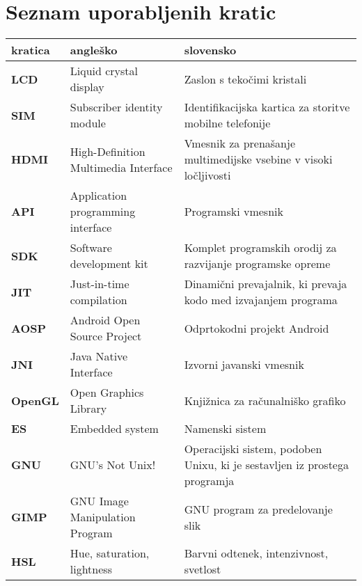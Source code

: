 \chapter*{Seznam uporabljenih kratic}

\begin{tabular}{l|p{5cm}|p{6cm}}
  {\bf kratica} & {\bf angleško} & {\bf slovensko} \\ \hline
  {\bf LCD} & Liquid crystal display & Zaslon s tekočimi kristali \\
  {\bf SIM} & Subscriber identity module & Identifikacijska kartica za storitve mobilne telefonije \\
  {\bf HDMI} & High-Definition Multimedia Interface & Vmesnik za prenašanje multimedijske vsebine v visoki ločljivosti \\
  {\bf API} & Application programming interface & Programski vmesnik \\
  {\bf SDK} & Software development kit & Komplet programskih orodij za razvijanje programske opreme \\
  {\bf JIT} & Just-in-time compilation & Dinamični prevajalnik, ki prevaja kodo med izvajanjem programa \\
  {\bf AOSP} & Android Open Source Project & Odprtokodni projekt Android \\
  {\bf JNI} & Java Native Interface & Izvorni javanski vmesnik \\
  {\bf OpenGL} & Open Graphics Library & Knjižnica za računalniško grafiko \\
  {\bf ES} & Embedded system & Namenski sistem \\
  {\bf GNU} & GNU's Not Unix! & Operacijski sistem, podoben Unixu, ki je sestavljen iz prostega programja \\
  {\bf GIMP} & GNU Image Manipulation Program & GNU program za predelovanje slik \\
  {\bf HSL} & Hue, saturation, lightness & Barvni odtenek, intenzivnost, svetlost
\end{tabular}
